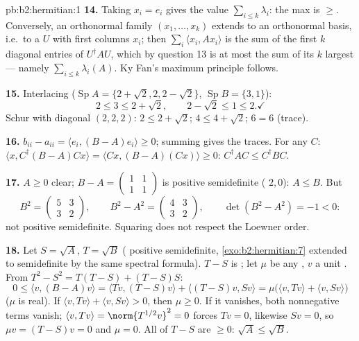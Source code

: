 \begin{solution}{pb:b2:hermitian:1}
\textbf{14.} Taking $x_i = e_i$ gives the value
$\sum_{i\leq k}\lambda_i$: the max is $\geq$. Conversely, an
orthonormal family $(x_1, \dots, x_k)$ extends to an
orthonormal basis, i.e.\ to a  $U$ with first columns
$x_i$; then $\sum_i\langle x_i, Ax_i\rangle$ is the sum of the
first $k$ diagonal entries of $U^\dagger AU$, which by question
13 is at most the sum of its $k$ largest  ---
namely $\sum_{i\leq k}\lambda_i(A)$. Ky Fan's maximum
principle follows.

\textbf{15.} Interlacing ($\operatorname{Sp}A = \{2+\sqrt2, 2,
2-\sqrt2\}$, $\operatorname{Sp}B = \{3, 1\}$):
\[
2 \leq 3 \leq 2 + \sqrt2,
\qquad
2 - \sqrt2 \leq 1 \leq 2 . \checkmark
\]
Schur with diagonal $(2,2,2)$: $2 \leq 2+\sqrt2$; $4 \leq 4 +
\sqrt2$; $6 = 6$ (trace). \checkmark

\textbf{16.} $b_{ii} - a_{ii} = \langle e_i, (B-A)e_i\rangle
\geq 0$; summing gives the traces. For any $C$: $\langle x,
C^\dagger(B - A)Cx\rangle = \langle Cx, (B-A)(Cx)\rangle \geq
0$: $C^\dagger AC \leq C^\dagger BC$.

\textbf{17.} $A \geq 0$ clear; $B - A = \begin{pmatrix} 1 & 1\\
1 & 1\end{pmatrix}$ is positive semidefinite ( $2,
0$): $A \leq B$. But
\[
B^2 = \begin{pmatrix} 5 & 3\\ 3 & 2\end{pmatrix},
\qquad
B^2 - A^2 = \begin{pmatrix} 4 & 3\\ 3 & 2\end{pmatrix},
\qquad \det(B^2 - A^2) = -1 < 0 :
\]
not positive semidefinite. Squaring does not respect the
Loewner order.

\textbf{18.} Let $S = \sqrt A$, $T = \sqrt B$ (
positive semidefinite, \cref{exo:b2:hermitian:7} extended to
semidefinite by the same spectral formula). $T - S$ is
; let $\mu$ be any , $v$ a unit .
From $T^2 - S^2 = T(T - S) + (T - S)S$:
\[
0 \leq \langle v, (B - A)v\rangle
= \langle Tv, (T-S)v\rangle + \langle (T-S)v, Sv\rangle
= \mu\bigl(\langle v, Tv\rangle + \langle v,
Sv\rangle\bigr)
\]
($\mu$ is real). If $\langle v, Tv\rangle + \langle v,
Sv\rangle > 0$, then $\mu \geq 0$. If it vanishes, both
nonnegative terms vanish; $\langle v, Tv\rangle =
\norm{T^{1/2}v}^2 = 0$ forces $Tv = 0$, likewise $Sv = 0$, so
$\mu v = (T - S)v = 0$ and $\mu = 0$. All  of $T -
S$ are $\geq 0$: $\sqrt A \leq \sqrt B$.


\end{solution}
